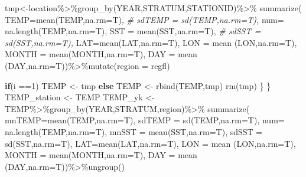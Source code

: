 \documentclass[
]{article}
\newenvironment{Shaded}{\begin{snugshade}}{\end{snugshade}}
\newcommand{\AttributeTok}[1]{\textcolor[rgb]{0.77,0.63,0.00}{#1}}
\newcommand{\CommentTok}[1]{\textcolor[rgb]{0.56,0.35,0.01}{\textit{#1}}}
\newcommand{\ControlFlowTok}[1]{\textcolor[rgb]{0.13,0.29,0.53}{\textbf{#1}}}
\newcommand{\DecValTok}[1]{\textcolor[rgb]{0.00,0.00,0.81}{#1}}
\newcommand{\FunctionTok}[1]{\textcolor[rgb]{0.00,0.00,0.00}{#1}}
\newcommand{\NormalTok}[1]{#1}
\newcommand{\OtherTok}[1]{\textcolor[rgb]{0.56,0.35,0.01}{#1}}
\newcommand{\SpecialCharTok}[1]{\textcolor[rgb]{0.00,0.00,0.00}{#1}}
\begin{document}
\begin{Shaded}
\begin{Highlighting}[]
\NormalTok{    tmp}\OtherTok{\textless{}{-}}\NormalTok{location}\SpecialCharTok{\%\textgreater{}\%}\FunctionTok{group\_by}\NormalTok{(YEAR,STRATUM,STATIONID)}\SpecialCharTok{\%\textgreater{}\%}
      \FunctionTok{summarize}\NormalTok{(}
        \AttributeTok{TEMP=}\FunctionTok{mean}\NormalTok{(TEMP,}\AttributeTok{na.rm=}\NormalTok{T),}
       \CommentTok{\# sdTEMP = sd(TEMP,na.rm=T),}
        \AttributeTok{num=} \FunctionTok{na.length}\NormalTok{(TEMP,}\AttributeTok{na.rm=}\NormalTok{T),}
        \AttributeTok{SST =} \FunctionTok{mean}\NormalTok{(SST,}\AttributeTok{na.rm=}\NormalTok{T),}
       \CommentTok{\# sdSST = sd(SST,na.rm=T),}
        \AttributeTok{LAT=}\FunctionTok{mean}\NormalTok{(LAT,}\AttributeTok{na.rm=}\NormalTok{T),}
        \AttributeTok{LON =} \FunctionTok{mean}\NormalTok{ (LON,}\AttributeTok{na.rm=}\NormalTok{T),}
        \AttributeTok{MONTH =} \FunctionTok{mean}\NormalTok{(MONTH,}\AttributeTok{na.rm=}\NormalTok{T),}
        \AttributeTok{DAY =} \FunctionTok{mean}\NormalTok{ (DAY,}\AttributeTok{na.rm=}\NormalTok{T))}\SpecialCharTok{\%\textgreater{}\%}\FunctionTok{mutate}\NormalTok{(}\AttributeTok{region =}\NormalTok{ regfl)}
    
    \ControlFlowTok{if}\NormalTok{(i }\SpecialCharTok{==}\DecValTok{1}\NormalTok{)}
\NormalTok{      TEMP }\OtherTok{\textless{}{-}}\NormalTok{ tmp}
    \ControlFlowTok{else}
\NormalTok{      TEMP }\OtherTok{\textless{}{-}} \FunctionTok{rbind}\NormalTok{(TEMP,tmp)}
    \FunctionTok{rm}\NormalTok{(tmp)}
\NormalTok{\}}
\NormalTok{  \}}
\NormalTok{  TEMP\_station }\OtherTok{\textless{}{-}}\NormalTok{ TEMP}
\NormalTok{  TEMP\_yk }\OtherTok{\textless{}{-}}\NormalTok{ TEMP}\SpecialCharTok{\%\textgreater{}\%}\FunctionTok{group\_by}\NormalTok{(YEAR,STRATUM,region)}\SpecialCharTok{\%\textgreater{}\%}
      \FunctionTok{summarize}\NormalTok{(}
        \AttributeTok{mnTEMP=}\FunctionTok{mean}\NormalTok{(TEMP,}\AttributeTok{na.rm=}\NormalTok{T),}
        \AttributeTok{sdTEMP =} \FunctionTok{sd}\NormalTok{(TEMP,}\AttributeTok{na.rm=}\NormalTok{T),}
        \AttributeTok{num=} \FunctionTok{na.length}\NormalTok{(TEMP,}\AttributeTok{na.rm=}\NormalTok{T),}
        \AttributeTok{mnSST =} \FunctionTok{mean}\NormalTok{(SST,}\AttributeTok{na.rm=}\NormalTok{T),}
        \AttributeTok{sdSST =} \FunctionTok{sd}\NormalTok{(SST,}\AttributeTok{na.rm=}\NormalTok{T),}
        \AttributeTok{LAT=}\FunctionTok{mean}\NormalTok{(LAT,}\AttributeTok{na.rm=}\NormalTok{T),}
        \AttributeTok{LON =} \FunctionTok{mean}\NormalTok{ (LON,}\AttributeTok{na.rm=}\NormalTok{T),}
        \AttributeTok{MONTH =} \FunctionTok{mean}\NormalTok{(MONTH,}\AttributeTok{na.rm=}\NormalTok{T),}
        \AttributeTok{DAY =} \FunctionTok{mean}\NormalTok{ (DAY,}\AttributeTok{na.rm=}\NormalTok{T))}\SpecialCharTok{\%\textgreater{}\%}\FunctionTok{ungroup}\NormalTok{()}
  

\end{Highlighting}
\end{Shaded}
\end{document}
